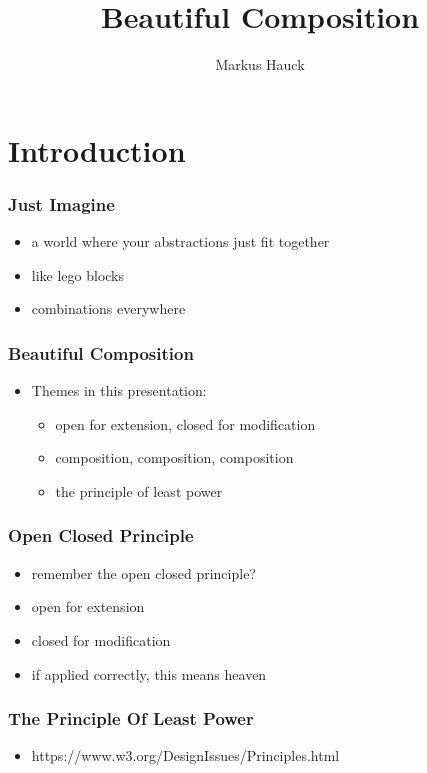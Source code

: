 \documentclass[aspectratio=169]{beamer}
\title{Beautiful Composition}
\author{Markus Hauck}
\begin{document}
\begin{frame}
  \titlepage{}
\end{frame}

\section{Introduction}\label{sec:introduction}

\begin{frame}
  \frametitle{Just Imagine}
  \begin{itemize}
  \item a world where your abstractions just fit together
  \item like lego blocks
  \item combinations everywhere
  \end{itemize}
\end{frame}

\begin{frame}
  \frametitle{Beautiful Composition}
  \begin{itemize}
  \item Themes in this presentation:
    \begin{itemize}
    \item open for extension, closed for modification
    \item composition, composition, composition
    \item the principle of least power
    \end{itemize}
  \end{itemize}
\end{frame}

\begin{frame}
  \frametitle{Open Closed Principle}
  \begin{itemize}
  \item remember the open closed principle?
  \item open for extension
  \item closed for modification
  \item if applied correctly, this means heaven
  \end{itemize}
\end{frame}

\begin{frame}
  \frametitle{The Principle Of Least Power}
  \begin{itemize}
  \item https://www.w3.org/DesignIssues/Principles.html
  \end{itemize}
\end{frame}
\end{document}

